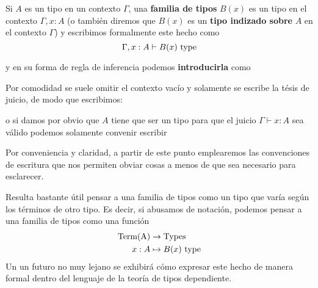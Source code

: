 \documentclass{article}
\begin{document}
        \begin{definition}
            Si $A$ es un tipo en un contexto $\Gamma$, una \textbf{familia de tipos} $B(x)$ es un tipo en el contexto $\Gamma, x : A$ (o también diremos
            que $B(x)$ es un \textbf{tipo indizado sobre} $A$ en el contexto $\Gamma$) y
            escribimos formalmente este hecho como
            $$
                \Gamma, x : A \vdash B(x)\ \type
            $$

            y en su forma de regla de inferencia podemos \textbf{introducirla} como
            \begin{prooftree}
            \end{prooftree}

            Por comodidad se suele omitir el contexto vacío y solamente se escribe la tésis de juicio, de modo que escribimos:

            \begin{prooftree}
            \end{prooftree}

            o si damos por obvio que $A$ tiene que ser un tipo para que el juicio $\Gamma \vdash x : A$ sea válido podemos solamente convenir escribir
            \begin{prooftree}
            \end{prooftree}
        
            Por conveniencia y claridad, a partir de este punto emplearemos las convenciones de escritura que nos permiten obviar cosas a menos de que sea
            necesario para esclarecer.
        \end{definition}

        \begin{remark}
            Resulta bastante útil pensar a una familia de tipos como un tipo que varía según los términos de otro tipo. 
            Es decir, si abusamos de notación, podemos pensar a una familia de tipos como una función 
            \begin{align*}
                \mathrm{Term(A)} &\rightarrow \mathrm{Types}\\
                x : A &\mapsto B(x)\ \type
            \end{align*}
            Un un futuro no muy lejano se exhibirá cómo expresar este hecho de manera formal dentro del lenguaje de la teoría de tipos dependiente.
        \end{remark}
\end{document}
